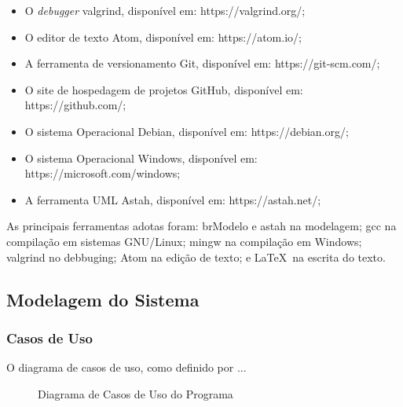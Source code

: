 \documentclass{subfiles}
\begin{document}
		\begin{itemize}
			\item O \textit{debugger} valgrind, disponível em: https://valgrind.org/;
			\item O editor de texto Atom, disponível em: https://atom.io/;
			\item A ferramenta de versionamento Git, disponível em: https://git-scm.com/;
			\item O site de hospedagem de projetos GitHub, disponível em: https://github.com/;
			\item O sistema Operacional Debian, disponível em: https://debian.org/;
			\item O sistema Operacional Windows, disponível em: https://microsoft.com/windows;
			\item A ferramenta UML Astah, disponível em: https://astah.net/;
		\end{itemize}
		\par As principais ferramentas adotas foram: brModelo e astah na modelagem; gcc na compilação em sistemas GNU/Linux; mingw na compilação em Windows; valgrind no debbuging; Atom na edição de texto; e \LaTeX \, na escrita do texto.

	\subsection{Modelagem do Sistema}




		\subsubsection{Casos de Uso}

			\par O diagrama de casos de uso, como definido por ...

			\begin{figure}[h!]
				\centering
				\caption{Diagrama de Casos de Uso do Programa}
				\label{fig:cdu}
			\end{figure}
\end{document}
